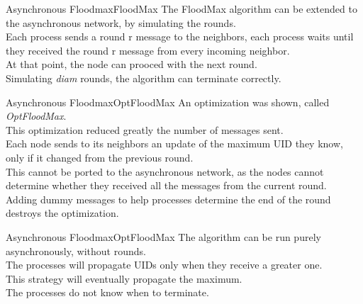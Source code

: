 \documentclass[pdf]{beamer}
\begin{document}
\begin{frame}{Asynchronous Floodmax}{FloodMax}
    The FloodMax algorithm can be extended to the asynchronous network, by simulating
    the rounds.\\
    \pause
    \vspace{12pt}
    Each process sends a round r message to the neighbors, each process waits until 
    they received the round r message from every incoming neighbor. \\ 
    At that point, the node can prooced with the next round.\\
    \pause
    \vspace{12pt}
    Simulating \emph{diam} rounds, the algorithm can terminate correctly.
\end{frame}

\begin{frame}{Asynchronous Floodmax}{OptFloodMax}
    An optimization was shown, called \emph{OptFloodMax}.\\
    This optimization reduced greatly the number of messages sent.\\
    \pause
    \vspace{12pt}
    Each node sends to its neighbors an update of the maximum UID they know, only if
    it changed from the previous round.\\
    \pause
    \vspace{12pt}
    This cannot be ported to the asynchronous network, as the nodes cannot determine whether
    they received all the messages from the current round.\\
    \pause
    \vspace{12pt}
    Adding dummy messages to help processes determine the end of the round destroys the 
    optimization.
\end{frame}

\begin{frame}{Asynchronous Floodmax}{OptFloodMax}
    The algorithm can be run purely asynchronously, without rounds.\\
    The processes will propagate UIDs only when they receive a greater one.\\
    \pause
    \vspace{12pt}
    This strategy will eventually propagate the maximum.\\
    \pause
    \vspace{12pt}
    The processes do not know when to terminate.
\end{frame}
\end{document}
